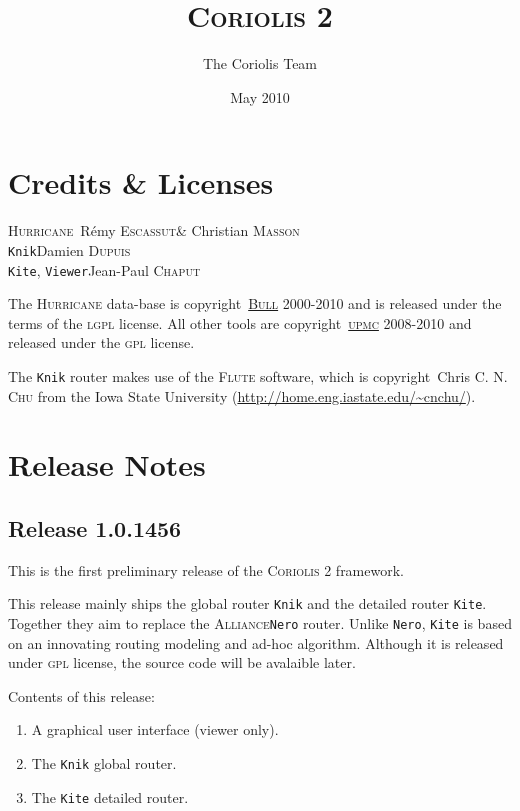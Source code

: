 \documentclass[11pt]{article}
\newcommand{\xhref}        [2]{\href{#2}{#1}}
\newcommand{\xhref}        [2]{\htmladdnormallink{#1}{#2}}
\newcommand {\Chu}                {\textsc{Chu}\xspace}
\newcommand {\Chaput}             {\textsc{Chaput}\xspace}
\newcommand {\Dupuis}             {\textsc{Dupuis}\xspace}
\newcommand {\Escassut}           {\textsc{Escassut}\xspace}
\newcommand {\Masson}             {\textsc{Masson}\xspace}
\newcommand {\LGPL}               {\textsc{lgpl}\xspace}
\newcommand {\GPL}                {\textsc{gpl}\xspace}
\newcommand {\Bull}               {\xhref{\textsc{Bull}}{http://www.bull.com/}\xspace}
\newcommand {\UPMC}               {\xhref{\textsc{upmc}}{http://www.upmc.fr/}\xspace}
\newcommand {\Flute}              {\textsc{Flute}\xspace}
\newcommand {\FluteRef}           {\xhref{http://home.eng.iastate.edu/\~{}cnchu/}%
                                      {http://home.eng.iastate.edu/~cnchu/}\xspace}
\newcommand {\Alliance}           {\textsc{Alliance}\xspace}
\newcommand {\Nero}               {\texttt{Nero}\xspace}
\newcommand {\CoriolisII}         {\textsc{Coriolis 2}\xspace}
\newcommand {\Hurricane}          {\textsc{Hurricane}\xspace}
\newcommand {\Knik}               {\texttt{Knik}\xspace}
\newcommand {\Kite}               {\texttt{Kite}\xspace}
\newcommand {\Viewer}             {\texttt{Viewer}\xspace}
\begin{document}
 \title{\CoriolisII}
 \author{The Coriolis Team}
 \date{May 2010}

 \maketitle

 \thispagestyle{fancy}

 \tableofcontents

 \section{Credits \& Licenses}

 \begin{center}
   \Hurricane     \dotfill\      Rémy \Escassut \& Christian \Masson   \\
   \Knik          \dotfill     Damien \Dupuis   \\
   \Kite, \Viewer \dotfill  Jean-Paul \Chaput   \\
 \end{center}

 The \Hurricane data-base is copyright\textcopyright\ \Bull 2000-2010 and is
 released under the terms of the \LGPL license. All other tools are
 copyright\textcopyright\ \UPMC 2008-2010 and released under the \GPL
 license. 

 The \Knik router makes use of the \Flute software, which is
 copyright\textcopyright\ Chris C. N. \Chu from the Iowa State University
 (\FluteRef).

 \newpage


 \section{Release Notes}

 \subsection{Release 1.0.1456}

 This is the first preliminary release of the \CoriolisII framework.

 This release mainly ships the global router \Knik and the detailed router
 \Kite. Together they aim to replace the \Alliance \Nero router.
 Unlike \Nero, \Kite is based on an innovating routing modeling and ad-hoc
 algorithm. Although it is released under \GPL license, the source code
 will be avalaible later.
 \medskip

 \noindent Contents of this release:
 \begin{enumerate}
   \item A graphical user interface (viewer only).
   \item The \Knik global router.
   \item The \Kite detailed router.
 \end{enumerate}
\end{document}
